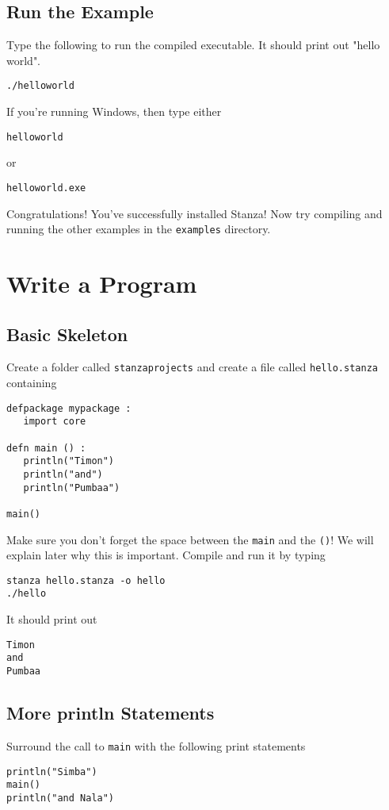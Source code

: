 \documentclass[10pt,oneside]{book}
\begin{document}
\subsection*{Run the Example}
Type the following to run the compiled executable. It should print out "hello world".
\begin{lstlisting}
./helloworld
\end{lstlisting}

If you're running Windows, then type either
\begin{lstlisting}
helloworld
\end{lstlisting}
or
\begin{lstlisting}
helloworld.exe
\end{lstlisting}

Congratulations! You've successfully installed Stanza! Now try compiling and running the other examples in the \texttt{\frenchspacing examples} directory.

\section{Write a Program}
\subsection*{Basic Skeleton}
Create a folder called \texttt{\frenchspacing stanzaprojects} and create a file called \texttt{\frenchspacing hello.stanza} containing
\begin{lstlisting}
defpackage mypackage :
   import core
   
defn main () :
   println("Timon")
   println("and")
   println("Pumbaa")

main()
\end{lstlisting}
Make sure you don't forget the space between the \texttt{\frenchspacing main} and the \texttt{\frenchspacing ()}! We will explain later why this is important. Compile and run it by typing
\begin{lstlisting}
stanza hello.stanza -o hello
./hello
\end{lstlisting}

It should print out
\begin{lstlisting}
Timon
and
Pumbaa
\end{lstlisting}

\subsection*{More println Statements}
Surround the call to \texttt{\frenchspacing main} with the following print statements
\begin{lstlisting}
println("Simba")
main()
println("and Nala")
\end{lstlisting}
\end{document}
